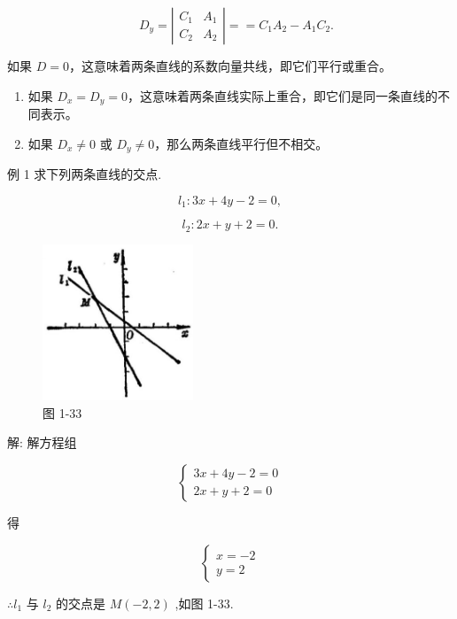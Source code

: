 \documentclass[lang=cn,newtx,10pt,scheme=chinese]{elegantbook}
\begin{document}
\[ \quad
D_y = \left| \begin{array}{cc}
               C_1 & A_1 \\
               C_2 & A_2
\end{array} \right| ==C_1A_2-A_1C_2.
\]

如果 \(D = 0\)，这意味着两条直线的系数向量共线，即它们平行或重合。

\begin{enumerate}
  \item 如果 \(D_x = D_y = 0\)，这意味着两条直线实际上重合，即它们是同一条直线的不同表示。
  \item 如果 \(D_x \neq 0\) 或 \(D_y \neq 0\)，那么两条直线平行但不相交。
\end{enumerate}

例 1 求下列两条直线的交点.

\[
    {l}_{1} : {3x} + {4y} - 2 = 0,
\]

\[
    {l}_{2} : {2x} + y + 2 = 0.
\]

\begin{figure}[h]
  \centering
  \includegraphics[max width=0.4\textwidth]{images/01912cc2-ffb6-728e-9ae7-b113ff05c64b_52_702387.jpg}
  \caption{图 1-33}
\end{figure}



解: 解方程组

\[
  \left\{ \begin{array}{l} {3x} + {4y} - 2 = 0 \\ {2x} + y + 2 = 0 \end{array}\right.
\]

得

\[
  \left\{ \begin{array}{l} x = - 2 \\ y = 2 \end{array}\right.
\]

\(\therefore {l}_{1}\) 与 \({l}_{2}\) 的交点是 \(M\left( {-2,2}\right)\) ,如图 1-33.
\end{document}
